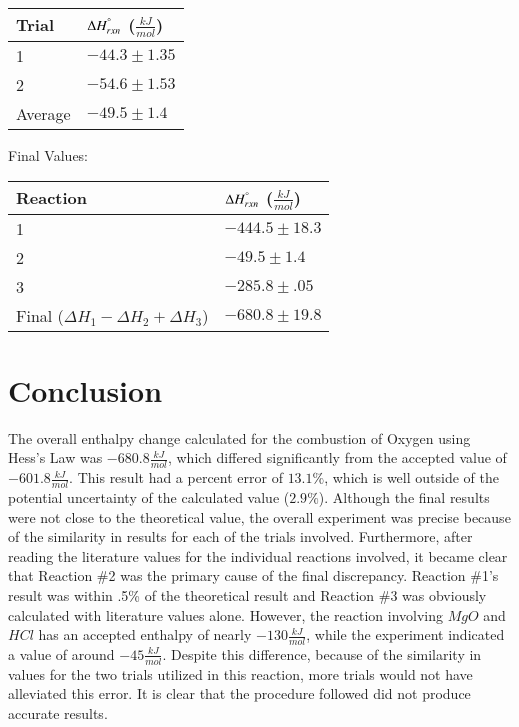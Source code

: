 \documentclass[12pt]{article}
\begin{document}
	\begin{center}
	\begin{tabular}{ |m{4cm}|m{4cm}| }
	\hline
	Trial & $\Delta H^{\degree}_{rxn}$ ($\frac{kJ}{mol}$) \\
	\hline
	1 & $-44.3 \pm 1.35$ \\
	2 & $-54.6 \pm 1.53$ \\
	\hline
	Average & $-49.5 \pm 1.4$ \\
	 \hline
	\end{tabular}
	\end{center}

Final Values:
	\begin{center}
	\begin{tabular}{ |m{4cm}|m{4cm}| }
	\hline
	Reaction & $\Delta H^{\degree}_{rxn}$ ($\frac{kJ}{mol}$) \\
	\hline
	1 & $-444.5 \pm 18.3$ \\
	2 & $-49.5 \pm 1.4$ \\
	3 & $-285.8 \pm .05$ \\
	\hline
	Final ($\Delta H_1 - \Delta H_2 + \Delta H_3$) & $-680.8 \pm 19.8$ \\
	 \hline
	\end{tabular}
	\end{center}

\section{Conclusion}
The overall enthalpy change calculated for the combustion of Oxygen using Hess's Law was $-680.8 \frac{kJ}{mol}$, which differed significantly from the accepted value of $-601.8 \frac{kJ}{mol}$. This result had a percent error of $13.1\%$, which is well outside of the potential uncertainty of the calculated value ($2.9\%$). Although the final results were not close to the theoretical value, the overall experiment was precise because of the similarity in results for each of the trials involved. Furthermore, after reading the literature values for the individual reactions involved, it became clear that Reaction \#2 was the primary cause of the final discrepancy. Reaction \#1's result was within .5\% of the theoretical result and Reaction \#3 was obviously calculated with literature values alone. However, the reaction involving $MgO$ and $HCl$ has an accepted enthalpy of nearly $-130 \frac{kJ}{mol}$, while the experiment indicated a value of around $-45 \frac{kJ}{mol}$. Despite this difference, because of the similarity in values for the two trials utilized in this reaction, more trials would not have alleviated this error. It is clear that the procedure followed did not produce accurate results.
\end{document}
